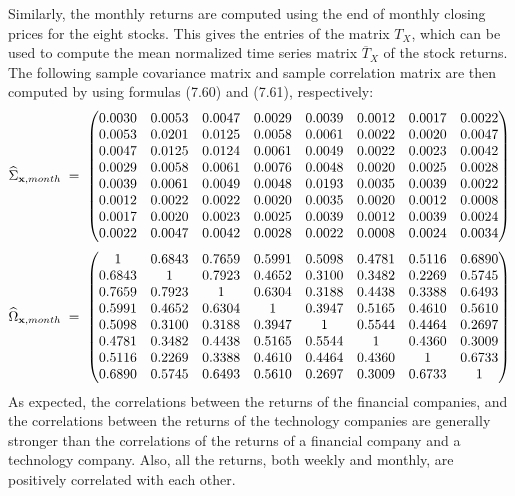 \begin{examplex}
Similarly, the monthly returns are computed using the end of monthly closing
prices for the eight stocks. This gives the entries of the matrix $T_X$, which can
be used to compute the mean normalized time series matrix $\overline{T}_X$ of the
stock returns. The following sample covariance matrix and sample correlation
matrix are then computed by using formulas (7.60) and (7.61), respectively:
\[
\widehat{\Sigma}_{\mathbf{x},month} \;=\;
\begin{pmatrix}
0.0030 & 0.0053 & 0.0047 & 0.0029 & 0.0039 & 0.0012 & 0.0017 & 0.0022 \\
0.0053 & 0.0201 & 0.0125 & 0.0058 & 0.0061 & 0.0022 & 0.0020 & 0.0047 \\
0.0047 & 0.0125 & 0.0124 & 0.0061 & 0.0049 & 0.0022 & 0.0023 & 0.0042 \\
0.0029 & 0.0058 & 0.0061 & 0.0076 & 0.0048 & 0.0020 & 0.0025 & 0.0028 \\
0.0039 & 0.0061 & 0.0049 & 0.0048 & 0.0193 & 0.0035 & 0.0039 & 0.0022 \\
0.0012 & 0.0022 & 0.0022 & 0.0020 & 0.0035 & 0.0020 & 0.0012 & 0.0008 \\
0.0017 & 0.0020 & 0.0023 & 0.0025 & 0.0039 & 0.0012 & 0.0039 & 0.0024 \\
0.0022 & 0.0047 & 0.0042 & 0.0028 & 0.0022 & 0.0008 & 0.0024 & 0.0034
\end{pmatrix}
\]
\[
\widehat{\Omega}_{\mathbf{x},month} \;=\;
\begin{pmatrix}
1      & 0.6843 & 0.7659 & 0.5991 & 0.5098 & 0.4781 & 0.5116 & 0.6890 \\
0.6843 & 1      & 0.7923 & 0.4652 & 0.3100 & 0.3482 & 0.2269 & 0.5745 \\
0.7659 & 0.7923 & 1      & 0.6304 & 0.3188 & 0.4438 & 0.3388 & 0.6493 \\
0.5991 & 0.4652 & 0.6304 & 1      & 0.3947 & 0.5165 & 0.4610 & 0.5610 \\
0.5098 & 0.3100 & 0.3188 & 0.3947 & 1      & 0.5544 & 0.4464 & 0.2697 \\
0.4781 & 0.3482 & 0.4438 & 0.5165 & 0.5544 & 1      & 0.4360 & 0.3009 \\
0.5116 & 0.2269 & 0.3388 & 0.4610 & 0.4464 & 0.4360 & 1      & 0.6733 \\
0.6890 & 0.5745 & 0.6493 & 0.5610 & 0.2697 & 0.3009 & 0.6733 & 1
\end{pmatrix}
\]
As expected, the correlations between the returns of the financial companies, and
the correlations between the returns of the technology companies are generally
stronger than the correlations of the returns of a financial company and a
technology company. Also, all the returns, both weekly and monthly, are positively
correlated with each other.
\end{examplex}

